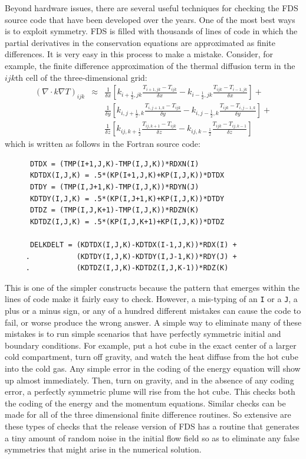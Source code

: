 \documentclass[11pt]{book}
\newcommand{\ct}{\tt\small}
\newcommand{\dx}{\delta x}
\newcommand{\dy}{\delta y}
\newcommand{\dz}{\delta z}
\newcommand{\ha}{\frac{1}{2}}
\begin{document}
Beyond hardware issues, there are several useful techniques for
checking the FDS source code that have been developed over the
years. One of the most best ways is to exploit symmetry. FDS is filled
with thousands of lines of code in which the partial derivatives in
the conservation equations are approximated as finite differences. It
is very easy in this process to make a mistake. Consider, for example,
the finite difference approximation of the thermal diffusion term in
the $ijk$th cell of the three-dimensional grid:
\begin{eqnarray*}
(\nabla \cdot k \nabla T)_{ijk} &\approx&
              \frac{1}{\dx}
         \left[k_{i+\ha,jk}\frac{T_{i+1,jk}-T_{ijk}}{\dx}
              -k_{i-\ha,jk}\frac{T_{ijk}-T_{i-1,jk}}{\dx}\right]+  \nonumber \\
            &&\frac{1}{\dy}
         \left[k_{i,j+\ha,k}\frac{T_{i,j+1,k}-T_{ijk}}{\dy}
              -k_{i,j-\ha,k}\frac{T_{ijk}-T_{i,j-1,k}}{\dy}\right]+ \nonumber \\
            &&\frac{1}{\dz}
         \left[k_{ij,k+\ha}\frac{T_{ij,k+1}-T_{ijk}}{\dz}
              -k_{ij,k-\ha}\frac{T_{ijk}-T_{ij,k-1}}{\dz}\right]
\end{eqnarray*}
which is written as follows in the Fortran source code:
\begin{verbatim}
      DTDX = (TMP(I+1,J,K)-TMP(I,J,K))*RDXN(I)
      KDTDX(I,J,K) = .5*(KP(I+1,J,K)+KP(I,J,K))*DTDX
      DTDY = (TMP(I,J+1,K)-TMP(I,J,K))*RDYN(J)
      KDTDY(I,J,K) = .5*(KP(I,J+1,K)+KP(I,J,K))*DTDY
      DTDZ = (TMP(I,J,K+1)-TMP(I,J,K))*RDZN(K)
      KDTDZ(I,J,K) = .5*(KP(I,J,K+1)+KP(I,J,K))*DTDZ

      DELKDELT = (KDTDX(I,J,K)-KDTDX(I-1,J,K))*RDX(I) +
     .           (KDTDY(I,J,K)-KDTDY(I,J-1,K))*RDY(J) +
     .           (KDTDZ(I,J,K)-KDTDZ(I,J,K-1))*RDZ(K)
\end{verbatim}
This is one of the simpler constructs because the pattern that emerges
within the lines of code make it fairly easy to check. However, a
mis-typing of an {\ct I} or a {\ct J}, a plus or a minus sign, or any
of a hundred different mistakes can cause the code to fail, or worse
produce the wrong answer. A simple way to eliminate many of these
mistakes is to run simple scenarios that have perfectly symmetric
initial and boundary conditions.  For example, put a hot cube in the
exact center of a larger cold compartment, turn off gravity, and watch
the heat diffuse from the hot cube into the cold gas. Any simple error
in the coding of the energy equation will show up almost
immediately. Then, turn on gravity, and in the absence of any coding
error, a perfectly symmetric plume will rise from the hot cube. This
checks both the coding of the energy and the momentum
equations. Similar checks can be made for all of the three dimensional
finite difference routines. So extensive are these types of checks
that the release version of FDS has a routine that generates a tiny
amount of random noise in the initial flow field so as to eliminate
any false symmetries that might arise in the numerical solution.
\end{document}
